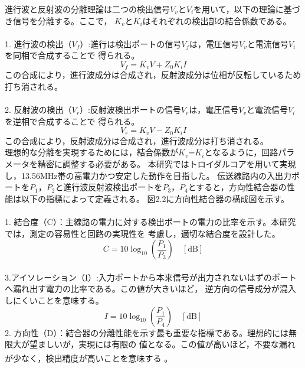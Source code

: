 \documentclass[uplatex, 12pt,oneside,openany]{ujbook}
\begin{document}
進行波と反射波の分離理論は二つの検出信号$V_v$と$V_i$を用いて，以下の理論に基づき信号を分離する。ここで，
$K_v$と$K_i$はそれぞれの検出部の結合係数である。\\\\
1. 進行波の検出（$V_f$）:進行は検出ポートの信号$V_f$は，電圧信号$V_v$と電流信号$V_i$を同相で合成することで
得られる。\\
\begin{equation}
    V_{f} = K_{v}V + Z_{0}K_{i}I
    \label{ed:2.2.1}
\end{equation}
この合成により，進行波成分は合成され，反射波成分は位相が反転しているため打ち消される。\\\\
2. 反射波の検出（$V_r$）:反射波検出ポートの信号$V_r$は，電圧信号$V_v$と電流信号$V_i$を逆相で合成することで
得られる。\\
\begin{equation}
    V_{r} = K_{v}V - Z_{0}K_{i}I
    \label{eq:2.2.2}
\end{equation}
この合成により，反射波成分は合成され，進行波成分は打ち消される。\\
理想的な分離を実現するためには，結合係数が$K_v$=$K_i$となるように，回路パラメータを精密に調整する必要がある。
本研究ではトロイダルコアを用いて実現し，13.56MHz帯の高電力かつ安定した動作を目指した。
伝送線路内の入出力ポートを$P_1$，$P_2$と進行波反射波検出ポートを$P_3$，$P_4$とすると，方向性結合器の性能は以下の指標によって定義される。
図2.2に方向性結合器の構成図を示す。\\\\
1. 結合度（C）：主線路の電力に対する検出ポートの電力の比率を示す。本研究では，測定の容易性と回路の実現性を
考慮し，適切な結合度を設計した。
\begin{equation}
  C = 10 \log_{10} \left( \frac{P_1}{P_3} \right) \quad [\mathrm{dB}]
  \label{eq:2.2.3}
\end{equation}\\
3.アイソレーション（I）:入力ポートから本来信号が出力されないはずのポートへ漏れ出す電力の比率である。この値が大きいほど，
逆方向の信号成分が混入しにくいことを意味する。
\begin{equation}
    I = 10 \log_{10} \left( \frac{P_{1}}{P_{4}} \right) \quad [\text{dB}]
\end{equation}
2. 方向性（D）：結合器の分離性能を示す最も重要な指標である。理想的には無限大が望ましいが，実現には有限の
値となる。この値が高いほど，不要な漏れが少なく，検出精度が高いことを意味する
\textsuperscript{\cite{match_coupler}}。
\end{document}
